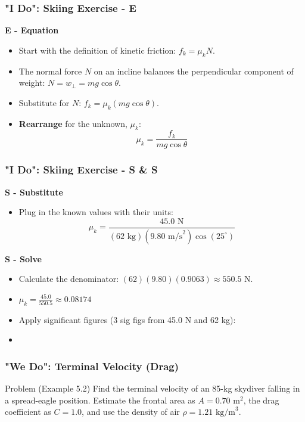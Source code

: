 \documentclass{beamer}
\begin{document}
\begin{frame}
\frametitle{"I Do": Skiing Exercise - E}
\textbf{E - Equation}
\begin{itemize}
    \item Start with the definition of kinetic friction: $f_k = \mu_k N$. \pause
    \item The normal force $N$ on an incline balances the perpendicular component of weight: $N = w_{\perp} = mg \cos\theta$. \pause
    \item Substitute for $N$: $f_k = \mu_k (mg \cos\theta)$. \pause
    \item \textbf{Rearrange} for the unknown, $\mu_k$:
    \[ \mu_k = \frac{f_k}{mg \cos\theta} \]
\end{itemize}
\end{frame}

\begin{frame}
\frametitle{"I Do": Skiing Exercise - S \& S}
\textbf{S - Substitute}
\begin{itemize}
    \item Plug in the known values with their units:
    \[ \mu_k = \frac{45.0 \text{ N}}{(62 \text{ kg})(9.80 \text{ m/s}^2) \cos(25^\circ)} \]
\end{itemize} \pause
\textbf{S - Solve}
\begin{itemize}
    \item Calculate the denominator: $(62)(9.80)(0.9063) \approx 550.5$ N.
    \item $\mu_k = \frac{45.0}{550.5} \approx 0.08174$
    \item Apply significant figures (3 sig figs from 45.0 N and 62 kg):
    \item {}
\end{itemize}
\end{frame}

\begin{frame}
\frametitle{"We Do": Terminal Velocity (Drag)}
\begin{block}{Problem (Example 5.2)}
Find the terminal velocity of an 85-kg skydiver falling in a spread-eagle position.
\newline\newline
Estimate the frontal area as $A = 0.70 \text{ m}^2$, the drag coefficient as $C=1.0$, and use the density of air $\rho=1.21 \text{ kg/m}^3$.
\end{block}
\end{frame}
\end{document}
